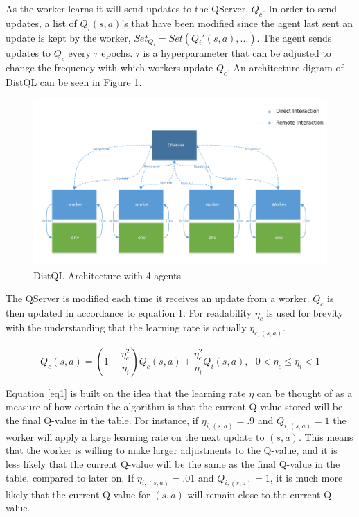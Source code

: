 \documentclass[jair,twoside,11pt,theapa]{article}
\begin{document}
As the worker learns it will send updates to the QServer, $Q_c$. In order to send updates, a list of $Q_i(s,a)$'s that have been modified since the agent last sent an update is kept by the worker, $Set_{Q_i} = Set(Q_i'(s,a),...)$. The agent sends updates to $Q_c$ every $\tau$ epochs. $\tau$ is a hyperparameter that can be adjusted to change the frequency with which workers update $Q_c$. An architecture digram of DistQL can be seen in Figure \ref{fig:DistQLArchitecture}. 

\begin{figure}[h]
\centering
\includegraphics[width=0.8\linewidth]{"DistQL Architecture-modified"}
\caption{DistQL Architecture with 4 agents}
\label{fig:DistQLArchitecture}
\end{figure}

The QServer is modified each time it receives an update from a worker. $Q_c$ is then updated in accordance to equation 1. For readability $\eta_c$ is used for brevity with the understanding that the learning rate is actually $\eta_{c,(s,a)}$.

\begin{equation}
\label{eq1}
Q_c(s,a) = (1-\frac{\eta_{c}^{2}}{\eta_{i}})Q_c(s,a) + \frac{\eta_{c}^{2}}{\eta_{i}} Q_i(s,a), \text{  } 0 < \eta_{c} \leq \eta_{i} < 1
\end{equation}

Equation \ref{eq1} is built on the idea that the learning rate $\eta$ can be thought of as a measure of how certain the algorithm is that the current Q-value stored will be the final Q-value in the table. For instance, if $\eta_{i,(s,a)} = .9$ and $Q_{i,(s,a)} = 1$ the worker will apply a large learning rate on the next update to $(s,a)$. This means that the worker is willing to make larger adjustments to the Q-value, and it is less likely that the current Q-value will be the same as the final Q-value in the table, compared to later on. If $\eta_{i,(s,a)} = .01$ and $Q_{i,(s,a)} = 1$, it is much more likely that the current Q-value for $(s,a)$ will remain close to the current Q-value. 
\end{document}
